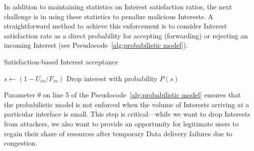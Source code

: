 
In addition to maintaining statistics on Interest satisfaction ratios, the next challenge is in using these statistics to penalize malicious Interests. A straightforward method to achieve this enforcement is to consider Interest satisfaction rate as a direct probability for accepting (forwarding) or rejecting an incoming Interest (see Pseudocode~\ref{alg:probabilistic model}).




\begin{algorithm}[h]
\footnotesize
\caption{\small Satisfaction-based Interest acceptance}
\label{alg:probabilistic model}
\begin{algorithmic}[1]
\State{} 

\vspace{0.1cm}

    \State{} 
    \State{} 
    
     
        \State $s \leftarrow (1 - U_{in} / F_{in})$
        \State Drop interest with probability $P(s)$
    \EndIf

\EndFunction

\end{algorithmic}
\end{algorithm}

Parameter $\theta$ on line 5 of the Pseudocode~\ref{alg:probabilistic model} ensures that the probabilistic model is not enforced when the volume of Interests arriving at a particular interface is small.
This step is critical---while we want to drop Interests from attackers, we also want to provide an opportunity for legitimate users to regain their share of resources after temporary Data delivery failures due to  congestion.

